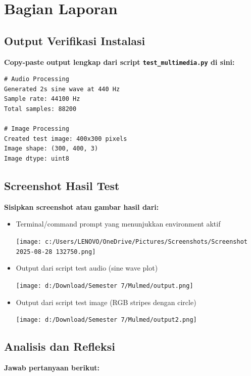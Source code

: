 \documentclass[11pt,a4paper]{article}
\begin{document}
\section{Bagian Laporan}

\subsection{Output Verifikasi Instalasi}
\textbf{Copy-paste output lengkap dari script \texttt{test\_multimedia.py} di sini:}

\begin{lstlisting}[caption=Output verifikasi instalasi]
# Audio Processing
Generated 2s sine wave at 440 Hz
Sample rate: 44100 Hz
Total samples: 88200

# Image Processing
Created test image: 400x300 pixels
Image shape: (300, 400, 3)
Image dtype: uint8
\end{lstlisting}

\subsection{Screenshot Hasil Test}
\textbf{Sisipkan screenshot atau gambar hasil dari:}
\begin{itemize}
    \item Terminal/command prompt yang menunjukkan environment aktif
    \begin{flushleft}
        \texttt{[image: c:/Users/LENOVO/OneDrive/Pictures/Screenshots/Screenshot 2025-08-28 132750.png]}
    \end{flushleft}
    \item Output dari script test audio (sine wave plot)
    \begin{flushleft}
        \texttt{[image: d:/Download/Semester 7/Mulmed/output.png]}
    \end{flushleft}
    \item Output dari script test image (RGB stripes dengan circle)
    \begin{flushleft}
        \texttt{[image: d:/Download/Semester 7/Mulmed/output2.png]}
    \end{flushleft}
\end{itemize}

\subsection{Analisis dan Refleksi}
\textbf{Jawab pertanyaan berikut:}
\end{document}
